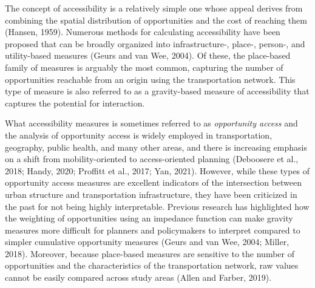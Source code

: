 \documentclass[]{elsarticle} %
\begin{document}
The concept of accessibility is a relatively simple one whose appeal
derives from combining the spatial distribution of opportunities and the
cost of reaching them (Hansen, 1959). Numerous methods for calculating
accessibility have been proposed that can be broadly organized into
infrastructure-, place-, person-, and utility-based measures (Geurs and
van Wee, 2004). Of these, the place-based family of measures is arguably
the most common, capturing the number of opportunities reachable from an
origin using the transportation network. This type of measure is also
referred to as a gravity-based measure of accessibility that captures
the potential for interaction.

What accessibility measures is sometimes referred to as
\emph{opportunity access} and the analysis of opportunity access is
widely employed in transportation, geography, public health, and many
other areas, and there is increasing emphasis on a shift from
mobility-oriented to access-oriented planning (Deboosere et al., 2018;
Handy, 2020; Proffitt et al., 2017; Yan, 2021). However, while these
types of opportunity access measures are excellent indicators of the
intersection between urban structure and transportation infrastructure,
they have been criticized in the past for not being highly
interpretable. Previous research has highlighted how the weighting of
opportunities using an impedance function can make gravity measures more
difficult for planners and policymakers to interpret compared to simpler
cumulative opportunity measures (Geurs and van Wee, 2004; Miller, 2018).
Moreover, because place-based measures are sensitive to the number of
opportunities and the characteristics of the transportation network, raw
values cannot be easily compared across study areas (Allen and Farber,
2019).
\end{document}
